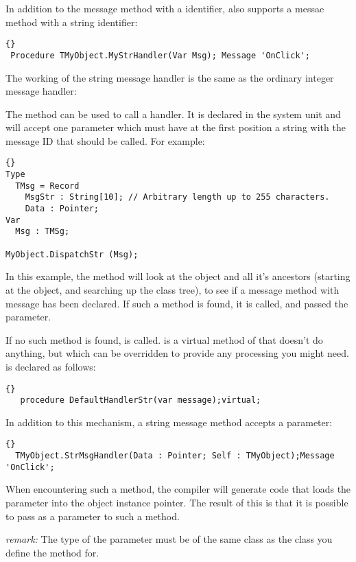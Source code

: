 \documentclass{report}
\begin{document}
In addition to the message method with a  identifier,
\fpc also supports a messae method with a string identifier:
\begin{lstlisting}{}
 Procedure TMyObject.MyStrHandler(Var Msg); Message 'OnClick';
\end{lstlisting}{}

The working of the string message handler is the same as the ordinary
integer message handler:

The  method can be used to call a 
handler. It is declared in the system unit and will accept one parameter
which must have at the first position a string with the message ID that
should be called. For example:
\begin{lstlisting}{}
Type 
  TMsg = Record
    MsgStr : String[10]; // Arbitrary length up to 255 characters.
    Data : Pointer;
Var
  Msg : TMSg;

MyObject.DispatchStr (Msg);
\end{lstlisting}{}
In this example, the  method will look at the object and 
all it's ancestors (starting at the object, and searching up the class tree), 
to see if a message method with message  has been
declared. If such a method is found, it is called, and passed the 
 parameter.

If no such method is found,  is called.
 is a virtual method of  that doesn't do 
anything, but which can be overridden to provide any processing you might
need.  is declared as follows:
\begin{lstlisting}{}
   procedure DefaultHandlerStr(var message);virtual;
\end{lstlisting}{}

In addition to this mechanism, a string message method accepts a 
parameter:
\begin{lstlisting}{}
  TMyObject.StrMsgHandler(Data : Pointer; Self : TMyObject);Message 'OnClick';
\end{lstlisting}{}
When encountering such a method, the compiler will generate code that loads
the  parameter into the object instance pointer. The result of
this is that it is possible to pass  as a parameter to such a
method. 

{\em remark:} The type of the  parameter must be of the same class
as the class you define the method for.


\end{document}
